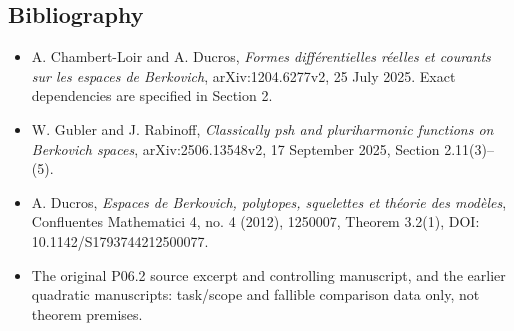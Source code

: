 \documentclass[11pt]{article}
\providecommand{\tightlist}{\setlength{\itemsep}{0pt}\setlength{\parskip}{0pt}}
\begin{document}
\subsection{Bibliography}\label{bibliography}

\begin{itemize}
\tightlist
\item
  A. Chambert-Loir and A. Ducros, \emph{Formes différentielles réelles
  et courants sur les espaces de Berkovich}, arXiv:1204.6277v2, 25 July
  2025. Exact dependencies are specified in Section 2.
\item
  W. Gubler and J. Rabinoff, \emph{Classically psh and pluriharmonic
  functions on Berkovich spaces}, arXiv:2506.13548v2, 17 September 2025,
  Section 2.11(3)--(5).
\item
  A. Ducros, \emph{Espaces de Berkovich, polytopes, squelettes et
  théorie des modèles}, Confluentes Mathematici 4, no. 4 (2012),
  1250007, Theorem 3.2(1), DOI: 10.1142/S1793744212500077.
\item
  The original P06.2 source excerpt and controlling manuscript, and the
  earlier quadratic manuscripts: task/scope and fallible comparison data
  only, not theorem premises.
\end{itemize}
\end{document}
